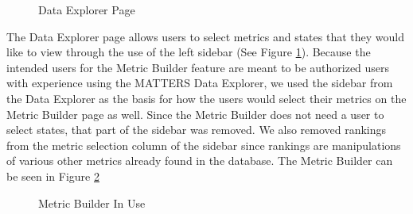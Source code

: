 			\begin{figure}[t]
				\centering
					\caption{Data Explorer Page}
				\label{fig:dataexplorer}
			\end{figure}
			
			The Data Explorer page allows users to select metrics and states that they would like to view through the use of the left sidebar (See Figure \ref{fig:dataexplorer}). 
			Because the intended users for the Metric Builder feature are meant to be authorized users with 
			experience using the MATTERS Data Explorer, we used the sidebar from the Data Explorer as the 
			basis for how the users would select their metrics on the Metric Builder page as well. Since the Metric Builder does not need a user to select states, 
			that part of the sidebar was removed. We also removed rankings from the metric selection column of the sidebar since rankings are manipulations of 
			various other metrics already found in the database. The Metric Builder can be seen in Figure \ref{fig:mb2}
			
				\begin{figure}[t]
					\centering
					\caption{Metric Builder In Use}
					\label{fig:mb2}
				\end{figure}
			
